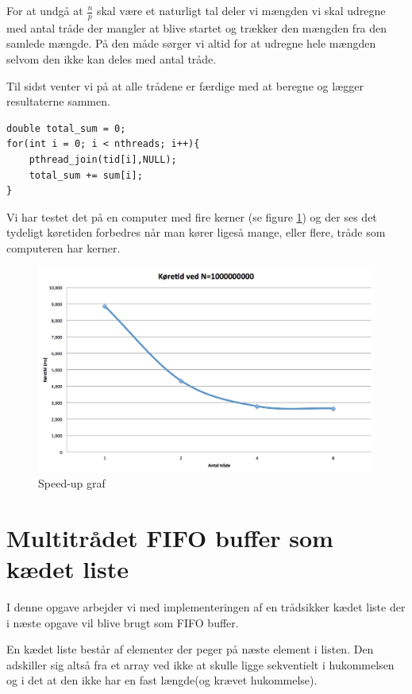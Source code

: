 \documentclass[danish]{report}
\begin{document}
For at undgå at $\frac{n}{p}$ skal være et naturligt tal deler vi mængden vi skal udregne med antal tråde der mangler at blive startet og trækker den mængden fra den samlede mængde. På den måde sørger vi altid for at udregne hele mængden selvom den ikke kan deles med antal tråde. 

Til sidst venter vi på at alle trådene er færdige med at beregne og lægger resultaterne sammen.

\begin{lstlisting}    
double total_sum = 0;
for(int i = 0; i < nthreads; i++){
    pthread_join(tid[i],NULL);
    total_sum += sum[i];
}
\end{lstlisting}

Vi har testet det på en computer med fire kerner (se figure \ref{fig:3}) og der ses det tydeligt køretiden forbedres når man kører ligeså mange, eller flere, tråde som computeren har kerner.

\begin{figure}[H]
\begin{center}
\includegraphics[scale=0.4]{img/3.png}
\caption{Speed-up graf}
\label{fig:3}
\end{center}
\end{figure}

\chapter{Multitrådet FIFO buffer som kædet liste}
I denne opgave arbejder vi med implementeringen af en trådsikker kædet liste der i næste opgave vil blive brugt som FIFO buffer.

En kædet liste består af elementer der peger på næste element i listen. Den adskiller sig altså fra et array ved ikke at skulle ligge sekventielt i hukommelsen og i det at den ikke har en fast længde(og krævet hukommelse).
\end{document}
